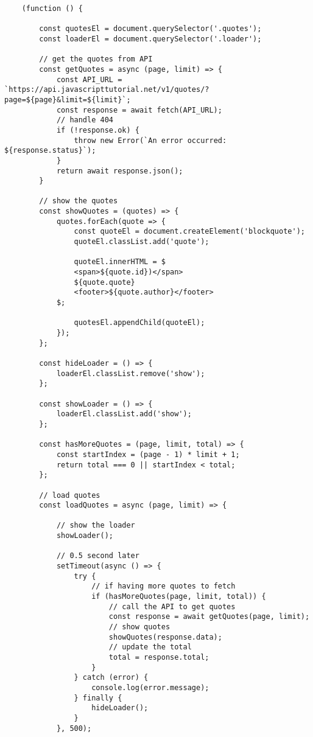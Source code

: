 \documentclass[11pt]{article}
\begin{document}
\begin{lstlisting}
    (function () {

        const quotesEl = document.querySelector('.quotes');
        const loaderEl = document.querySelector('.loader');

        // get the quotes from API
        const getQuotes = async (page, limit) => {
            const API_URL = `https://api.javascripttutorial.net/v1/quotes/?page=${page}&limit=${limit}`;
            const response = await fetch(API_URL);
            // handle 404
            if (!response.ok) {
                throw new Error(`An error occurred: ${response.status}`);
            }
            return await response.json();
        }

        // show the quotes
        const showQuotes = (quotes) => {
            quotes.forEach(quote => {
                const quoteEl = document.createElement('blockquote');
                quoteEl.classList.add('quote');

                quoteEl.innerHTML = $
                <span>${quote.id})</span>
                ${quote.quote}
                <footer>${quote.author}</footer>
            $;

                quotesEl.appendChild(quoteEl);
            });
        };

        const hideLoader = () => {
            loaderEl.classList.remove('show');
        };

        const showLoader = () => {
            loaderEl.classList.add('show');
        };

        const hasMoreQuotes = (page, limit, total) => {
            const startIndex = (page - 1) * limit + 1;
            return total === 0 || startIndex < total;
        };

        // load quotes
        const loadQuotes = async (page, limit) => {

            // show the loader
            showLoader();

            // 0.5 second later
            setTimeout(async () => {
                try {
                    // if having more quotes to fetch
                    if (hasMoreQuotes(page, limit, total)) {
                        // call the API to get quotes
                        const response = await getQuotes(page, limit);
                        // show quotes
                        showQuotes(response.data);
                        // update the total
                        total = response.total;
                    }
                } catch (error) {
                    console.log(error.message);
                } finally {
                    hideLoader();
                }
            }, 500);


\end{lstlisting}
\end{document}
